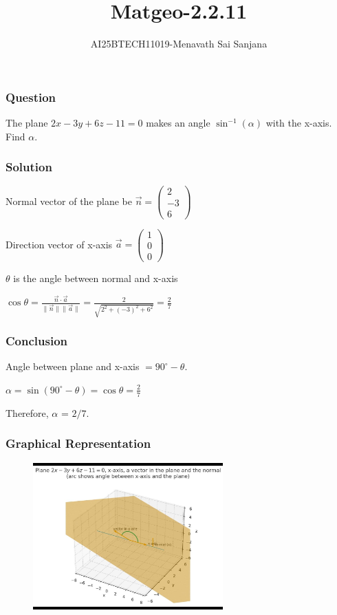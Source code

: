 \documentclass{beamer}
\title{Matgeo-2.2.11}
\author{AI25BTECH11019-Menavath Sai Sanjana}
\date{}
\theoremstyle{remark}
\newcommand{\myvec}[1]{\ensuremath{\begin{pmatrix}#1\end{pmatrix}}}
\begin{document}
\begin{frame}
\titlepage
\end{frame}

\begin{frame}
\frametitle{Question}
The plane $2x - 3y + 6z - 11 = 0$ makes an angle $\sin^{-1}(\alpha)$ with the x-axis. Find $\alpha$.
\end{frame}

\begin{frame}
\frametitle{Solution}

Normal vector of the plane be 
$
\overrightarrow{n} = \myvec{2 \\ -3 \\ 6} 
$

Direction vector of x-axis 
$
\overrightarrow{a} = \myvec{1 \\ 0 \\ 0}
$

$\theta$ is the angle between normal and x-axis

$
\cos \theta = \frac{\overrightarrow{n} \cdot \overrightarrow{a}}{\lVert \overrightarrow{n}\rVert \lVert \overrightarrow{a}\rVert}
= \frac{2}{\sqrt{2^2 + (-3)^2 + 6^2}}
= \frac{2}{7}
$
\end{frame}


\begin{frame}
\frametitle{Conclusion}
Angle between plane and x-axis $= 90^\circ - \theta$.

$
\alpha = \sin(90^\circ - \theta) = \cos\theta = \frac{2}{7}
$

Therefore, $\alpha$ = $2/7$.

\end{frame}

\begin{frame}
\frametitle{Graphical Representation}

\begin{figure}[ht!]
    \centering
    \includegraphics[width=0.65\textwidth]{matgeo-2.2.11.jpeg}
    \caption{}
    \label{fig:1.2.27.jpg}
\end{figure}
\end{frame}
\end{document}
